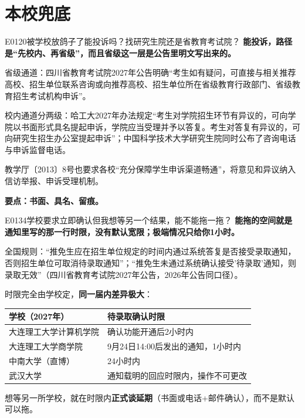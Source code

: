 \section{本校兜底}
\begin{qa}{E0120}{被学校放鸽子了能投诉吗？找研究生院还是省教育考试院？}
\textbf{能投诉，路径是“先校内、再省级”，而且省级这一层是公告里明文写出来的。}

省级通道：四川省教育考试院2027年公告明确“考生如有疑问，可直接与相关推荐高校、招生单位联系咨询或向推荐高校、招生单位所在省级教育行政部门、省级教育招生考试机构申诉”。

校内通道分两级：哈工大2027年办法规定“考生对学院招生环节有异议的，可向学院以书面形式具名提起申诉，学院应当受理并予以答复。考生对答复有异议的，可向研究生招生办公室提起申诉”；中国科学技术大学研究生院同时公布了咨询电话与申诉监督电话。

教学厅〔2013〕8号也要求各校“充分保障学生申诉渠道畅通”，将意见和异议纳入信访举报、申诉受理机制。

\textbf{要点：书面、具名、留痕。}
\end{qa}

\begin{qa}{E0134}{学校要求立即确认但我想等另一个结果，能不能拖一拖？}
\textbf{能拖的空间就是通知里写的那一行时限，没有默认宽限；极端情况只给你1小时。}

全国规则：“推免生应在招生单位规定的时间内通过系统答复是否接受录取通知，否则招生单位可取消待录取通知”；“推免生未通过系统确认接受'待录取'通知，则录取无效”（四川省教育考试院2027年公告，2026年公告同口径）。

时限完全由学校定，\textbf{同一届内差异极大}：

\par\vspace{2pt}\nobreak\begin{center}\footnotesize
\begin{tabularx}{\textwidth}{>{\raggedright\arraybackslash}X>{\raggedright\arraybackslash}X}
\toprule
\textbf{学校（2027年）} & \textbf{待录取确认时限} \\ \midrule
大连理工大学计算机学院 & 确认功能开通后2小时内 \\
大连理工大学商学院 & 9月24日14:00后发出的通知，1小时内 \\
中南大学（直博） & 24小时内 \\
武汉大学 & 通知载明的回应时限内，操作不可更改 \\
\bottomrule
\end{tabularx}
\end{center}\vspace{2pt}\par

想等另一所学校，就在时限内\textbf{正式谈延期}（书面或电话+邮件确认），而不是默认可以拖。
\end{qa}

